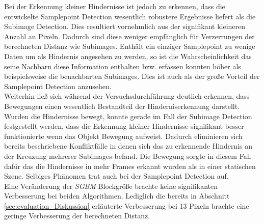 
\noindent
Bei der Erkennung kleiner Hindernisse ist jedoch zu erkennen, dass die entwickelte Samplepoint Detection wesentlich robustere Ergebnisse liefert als die Subimage Detection. Dies resultiert vornehmlich aus der signifikant kleineren Anzahl an Pixeln. Dadurch sind diese weniger empfänglich für Verzerrungen der berechneten Distanz wie Subimages. Enthält ein einziger Samplepoint zu wenige Daten um als Hindernis angesehen zu werden, so ist die Wahrscheinlichkeit das seine Nachbarn diese Information enthalten bzw. erfassen konnten höher als beispielsweise die benachbarten Subimages. Dies ist auch als der große Vorteil der Samplepoint Detection anzusehen.\\

\noindent
Weiterhin ließ sich während der Versuchsdurchführung deutlich erkennen, dass Bewegungen einen wesentlich Bestandteil der Hinderniserkennung darstellt. Wurden die Hindernisse bewegt, konnte gerade im Fall der Subimage Detection festgestellt werden, dass die Erkennung kleiner Hindernisse signifikant besser funktionierte wenn das Objekt Bewegung aufweist. Dadurch eliminieren sich bereits beschriebene Konfliktfälle in denen sich das zu erkennende Hindernis an der Kreuzung mehrerer Subimages befand. Die Bewegung sorgte in diesem Fall dafür das die Hindernisse in mehr Frames erkannt wurden als in einer statischen Szene. Selbiges Phänomen trat auch bei der Samplepoint Detection auf.\\

\noindent
Eine Veränderung der \emph{SGBM} Blockgröße brachte keine signifikanten Verbesserung bei beiden Algorithmen. Lediglich die bereits in Abschnitt \ref{sec:evaluation_Diskussion} erläuterte Verbesserung bei 13 Pixeln brachte eine geringe Verbesserung der berechneten Distanz. 



